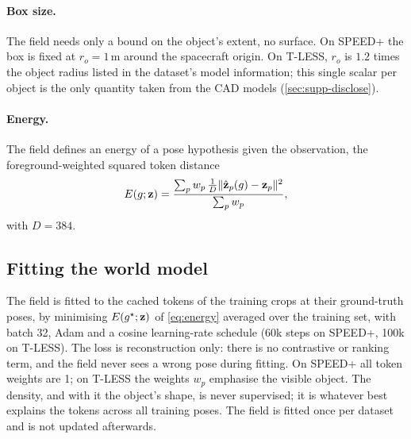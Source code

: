 \paragraph{Box size.}
The field needs only a bound on the object's extent, no surface. On SPEED+ the box is fixed at $r_o=1$\,m around the spacecraft origin.
On T-LESS, $r_o$ is $1.2$ times the object radius listed in the dataset's model information; this single scalar per object is the only
quantity taken from the CAD models (\cref{sec:supp-disclose}).

\paragraph{Energy.}
The field defines an energy of a pose hypothesis given the observation, the foreground-weighted squared token distance
\begin{equation}
E(g;\mathbf{z}) = \frac{\sum_p w_p\, \tfrac{1}{D}\|\hat{\mathbf{z}}_p(g)-\mathbf{z}_p\|^2}{\sum_p w_p},
\label{eq:energy}
\end{equation}
with $D=384$.

\subsection{Fitting the world model}
\label{sec:wmtrain}
The field is fitted to the cached tokens of the training crops at their ground-truth poses, by minimising $E(g^\star;\mathbf{z})$ of
\cref{eq:energy} averaged over the training set, with batch 32, Adam and a cosine learning-rate schedule (60k steps on SPEED+,
100k on T-LESS). The loss is reconstruction only: there is no contrastive or ranking term, and the field never sees a wrong pose
during fitting. On SPEED+ all token weights are 1; on T-LESS the weights $w_p$ emphasise the visible object. The density, and with it
the object's shape, is never supervised; it is whatever best explains the tokens across all training poses. The field is fitted once
per dataset and is not updated afterwards.

